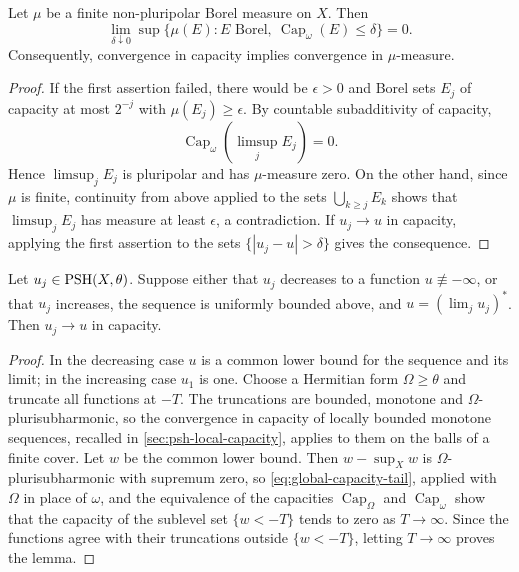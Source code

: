 \begin{lemma}\label{lem:npp-uniform-capacity}
Let $\mu$ be a finite non-pluripolar Borel measure on $X$. Then
\[
 \lim_{\delta\downarrow0}\sup\{\mu(E):E\text{ Borel},\
                      \operatorname{Cap}_\omega(E)\leq\delta\}=0.
\]
Consequently, convergence in capacity implies convergence in $\mu$-measure.
\end{lemma}
\begin{proof}
If the first assertion failed, there would be $\epsilon>0$ and Borel sets $E_j$ of capacity at most $2^{-j}$ with $\mu(E_j)\geq\epsilon$. By countable subadditivity of capacity,
\[
 \operatorname{Cap}_\omega\left(\limsup_j E_j\right)=0.
\]
Hence $\limsup_jE_j$ is pluripolar and has $\mu$-measure zero. On the other hand, since $\mu$ is finite, continuity from above applied to the sets $\bigcup_{k\geq j}E_k$ shows that $\limsup_jE_j$ has measure at least $\epsilon$, a contradiction. If $u_j\to u$ in capacity, applying the first assertion to the sets $\{|u_j-u|>\delta\}$ gives the consequence.
\end{proof}

\begin{lemma}\label{lem:monotone-psh-capacity}
Let $u_j\in\mathrm{PSH}(X,\theta)$. Suppose either that $u_j$ decreases to a function $u\not\equiv-\infty$, or that $u_j$ increases, the sequence is uniformly bounded above, and $u=(\lim_j u_j)^*$. Then $u_j\to u$ in capacity.
\end{lemma}
\begin{proof}
In the decreasing case $u$ is a common lower bound for the sequence and its limit; in the increasing case $u_1$ is one. Choose a Hermitian form $\Omega\geq\theta$ and truncate all functions at $-T$. The truncations are bounded, monotone and $\Omega$-plurisubharmonic, so the convergence in capacity of locally bounded monotone sequences, recalled in \cref{sec:psh-local-capacity}, applies to them on the balls of a finite cover. Let $w$ be the common lower bound. Then $w-\sup_Xw$ is $\Omega$-plurisubharmonic with supremum zero, so \eqref{eq:global-capacity-tail}, applied with $\Omega$ in place of $\omega$, and the equivalence of the capacities $\operatorname{Cap}_\Omega$ and $\operatorname{Cap}_\omega$ show that the capacity of the sublevel set $\{w<-T\}$ tends to zero as $T\to\infty$. Since the functions agree with their truncations outside $\{w<-T\}$, letting $T\to\infty$ proves the lemma.
\end{proof}

